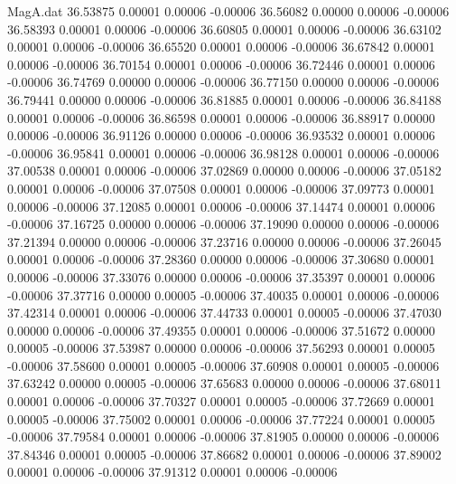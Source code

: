 \begin{filecontents}{MagA.dat}
  36.53875    0.00001    0.00006   -0.00006
  36.56082    0.00000    0.00006   -0.00006
  36.58393    0.00001    0.00006   -0.00006
  36.60805    0.00001    0.00006   -0.00006
  36.63102    0.00001    0.00006   -0.00006
  36.65520    0.00001    0.00006   -0.00006
  36.67842    0.00001    0.00006   -0.00006
  36.70154    0.00001    0.00006   -0.00006
  36.72446    0.00001    0.00006   -0.00006
  36.74769    0.00000    0.00006   -0.00006
  36.77150    0.00000    0.00006   -0.00006
  36.79441    0.00000    0.00006   -0.00006
  36.81885    0.00001    0.00006   -0.00006
  36.84188    0.00001    0.00006   -0.00006
  36.86598    0.00001    0.00006   -0.00006
  36.88917    0.00000    0.00006   -0.00006
  36.91126    0.00000    0.00006   -0.00006
  36.93532    0.00001    0.00006   -0.00006
  36.95841    0.00001    0.00006   -0.00006
  36.98128    0.00001    0.00006   -0.00006
  37.00538    0.00001    0.00006   -0.00006
  37.02869    0.00000    0.00006   -0.00006
  37.05182    0.00001    0.00006   -0.00006
  37.07508    0.00001    0.00006   -0.00006
  37.09773    0.00001    0.00006   -0.00006
  37.12085    0.00001    0.00006   -0.00006
  37.14474    0.00001    0.00006   -0.00006
  37.16725    0.00000    0.00006   -0.00006
  37.19090    0.00000    0.00006   -0.00006
  37.21394    0.00000    0.00006   -0.00006
  37.23716    0.00000    0.00006   -0.00006
  37.26045    0.00001    0.00006   -0.00006
  37.28360    0.00000    0.00006   -0.00006
  37.30680    0.00001    0.00006   -0.00006
  37.33076    0.00000    0.00006   -0.00006
  37.35397    0.00001    0.00006   -0.00006
  37.37716    0.00000    0.00005   -0.00006
  37.40035    0.00001    0.00006   -0.00006
  37.42314    0.00001    0.00006   -0.00006
  37.44733    0.00001    0.00005   -0.00006
  37.47030    0.00000    0.00006   -0.00006
  37.49355    0.00001    0.00006   -0.00006
  37.51672    0.00000    0.00005   -0.00006
  37.53987    0.00000    0.00006   -0.00006
  37.56293    0.00001    0.00005   -0.00006
  37.58600    0.00001    0.00005   -0.00006
  37.60908    0.00001    0.00005   -0.00006
  37.63242    0.00000    0.00005   -0.00006
  37.65683    0.00000    0.00006   -0.00006
  37.68011    0.00001    0.00006   -0.00006
  37.70327    0.00001    0.00005   -0.00006
  37.72669    0.00001    0.00005   -0.00006
  37.75002    0.00001    0.00006   -0.00006
  37.77224    0.00001    0.00005   -0.00006
  37.79584    0.00001    0.00006   -0.00006
  37.81905    0.00000    0.00006   -0.00006
  37.84346    0.00001    0.00005   -0.00006
  37.86682    0.00001    0.00006   -0.00006
  37.89002    0.00001    0.00006   -0.00006
  37.91312    0.00001    0.00006   -0.00006

\end{filecontents}
